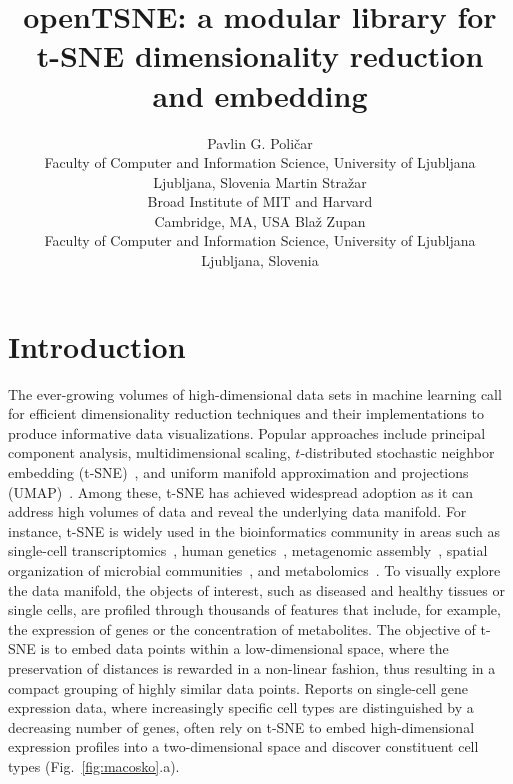 \documentclass[article]{jss}
\author{
  Pavlin G. Poli\v{c}ar\\
  Faculty of Computer and Information Science, University of Ljubljana\\
  Ljubljana, Slovenia
  \AND
  Martin Stra\v{z}ar\\
  Broad Institute of MIT and Harvard\\
  Cambridge, MA, USA
  \AND
  Bla\v{z} Zupan\\
  Faculty of Computer and Information Science, University of Ljubljana\\
  Ljubljana, Slovenia
}
\title{openTSNE: a modular \proglang{Python} library for t-SNE dimensionality reduction and embedding}
\begin{document}


\section[Introduction]{Introduction} \label{sec:intro}

The ever-growing volumes of high-dimensional data sets in machine learning call for efficient dimensionality reduction techniques and their implementations to produce informative data visualizations. Popular approaches include principal component analysis, multidimensional scaling, $t$-distributed stochastic neighbor embedding (t-SNE)~\citep{maaten2008visualizing}, and uniform manifold approximation and projections (UMAP)~\citep{2018arXivUMAP}. Among these, t-SNE has achieved widespread adoption as it can address high volumes of data and reveal the underlying data manifold. For instance, t-SNE is widely used in the bioinformatics community in areas such as single-cell transcriptomics~\citep{macosko2015highly,cao2019single,tasic2018shared}, human genetics~\citep{hirata2019genetic}, metagenomic assembly~\citep{beaulaurier2018metagenomic}, spatial organization of microbial communities~\citep{sheth2019spatial}, and metabolomics~\citep{tkachev2019differences}. To visually explore the data manifold, the objects of interest, such as diseased and healthy tissues or single cells, are profiled through thousands of features that include, for example, the expression of genes or the concentration of metabolites. The objective of t-SNE is to embed data points within a low-dimensional space, where the preservation of distances is rewarded in a non-linear fashion, thus resulting in a compact grouping of highly similar data points. Reports on single-cell gene expression data, where increasingly specific cell types are distinguished by a decreasing number of genes, often rely on t-SNE to embed high-dimensional expression profiles into a two-dimensional space and discover constituent cell types (Fig.~\ref{fig:macosko}.a). 
\end{document}

